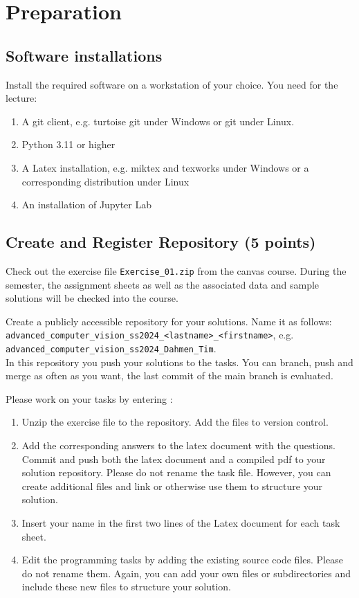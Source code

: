 \documentclass{article}
\begin{document}
\thispagestyle{page1} 

\section{Preparation}

\subsection{Software installations}

Install the required software on a workstation of your choice. You need for the lecture:

\begin{enumerate}
\item A git client, e.g. turtoise git under Windows or git under Linux.
\item Python 3.11 or higher 
\item A Latex installation, e.g. miktex and texworks under Windows or a corresponding distribution under Linux
\item An installation of Jupyter Lab
\end{enumerate}

\subsection{Create and Register Repository (5 points)}

Check out the exercise file \texttt{Exercise\_01.zip} from the canvas course. During the semester, the assignment sheets as well as the associated data and sample solutions will be checked into the course. 

Create a publicly accessible repository for your solutions. Name it as follows: \\ 
\texttt{advanced\_computer\_vision\_ss2024\_<lastname>\_<firstname>}, e.g. \texttt{advanced\_computer\_vision\_ss2024\_Dahmen\_Tim}. \\ 
In this repository you push your solutions to the tasks. You can branch, push and merge as often as you want, the last commit of the main branch is evaluated. 

Please work on your tasks by entering :

\begin{enumerate}
\item Unzip the exercise file to the repository. Add the files to version control.  
\item Add the corresponding answers to the latex document with the questions. Commit and push both the latex document and a compiled pdf to your solution repository. Please do not rename the task file. However, you can create additional files and link or otherwise use them to structure your solution. 
\item Insert your name in the first two lines of the Latex document for each task sheet.
\item Edit the programming tasks by adding the existing source code files. Please do not rename them. Again, you can add your own files or subdirectories and include these new files to structure your solution. 
\end{enumerate}
\end{document}
